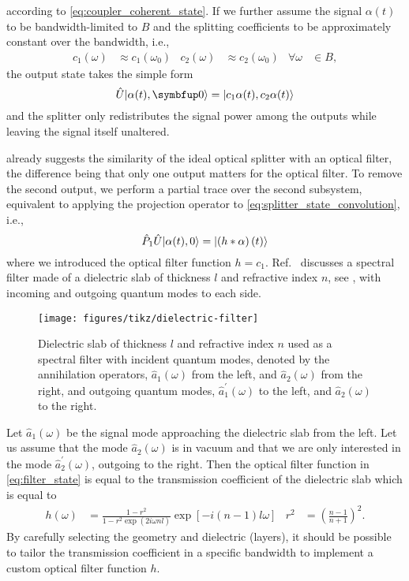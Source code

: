 according to \cref{eq:coupler_coherent_state}.
If we further assume the signal $\alpha(t)$ to be bandwidth-limited to $B$ and the splitting coefficients to be approximately constant over the bandwidth, i.e.,
\begin{align}
	c_1(\omega)
	&\approx
	c_1(\omega_0)
	&
	c_2(\omega)
	&\approx
	c_2(\omega_0)
	&
	\forall
	\omega
	&\in
	B
	,
\end{align}
the output state takes the simple form
\begin{equation}
	\hat{U}
	\ket*{\alpha(t),\vb{0}}
	=
	\ket*{c_1\alpha(t),c_2\alpha(t)}
\end{equation}
and the splitter only redistributes the signal power among the outputs while leaving the signal itself unaltered.

 already suggests the similarity of the ideal optical splitter with an optical filter, the difference being that only one output matters for the optical filter.
To remove the second output, we perform a partial trace over the second subsystem, equivalent to applying the projection operator to \cref{eq:splitter_state_convolution}, i.e.,
\begin{equation}
	\hat{P}_1
	\hat{U}
	\ket*{\alpha(t),0}
	=
	\ket*{\left(h\conv\alpha\right)(t)}
	\label{eq:filter_state}
\end{equation}
where we introduced the optical filter function $h=c_1$.
Ref.~\cite[p.~199]{Vogel2006} discusses a spectral filter made of a dielectric slab of thickness $l$ and refractive index $n$, see , with incoming and outgoing quantum modes to each side.
\begin{figure}[htb]
    \centering
    \texttt{[image: figures/tikz/dielectric-filter]}
    \caption{Dielectric slab of thickness $l$ and refractive index $n$ used as a spectral filter with incident quantum modes, denoted by the annihilation operators, $\hat{a}_1(\omega)$ from the left, and $\hat{a}_2(\omega)$ from the right, and outgoing quantum modes, $\hat{a}_1^\prime(\omega)$ to the left, and $\hat{a}_2(\omega)$ to the right.}\label{fig:dielectric_filter}
\end{figure}
Let $\hat{a}_1(\omega)$ be the signal mode approaching the dielectric slab from the left.
Let us assume that the mode $\hat{a}_2(\omega)$ is in vacuum and that we are only interested in the mode $\hat{a}_2^\prime(\omega)$, outgoing to the right.
Then the optical filter function in \cref{eq:filter_state} is equal to the transmission coefficient of the dielectric slab which is equal to~\cite[p.~199]{Vogel2006}
\begin{align}
	h(\omega)
	&=
	\frac{1-r^2}{1-r^2\exp(2i\omega nl)}
	\exp\left[-i(n-1)l\omega\right]
	&
	r^2
	&=
	\left(\frac{n-1}{n+1}\right)^2
	.
\end{align}
By carefully selecting the geometry and dielectric (layers), it should be possible to tailor the transmission coefficient in a specific bandwidth to implement a custom optical filter function $h$.